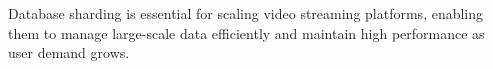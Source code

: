 Database sharding is essential for scaling video streaming platforms, enabling them to manage large-scale data efficiently and maintain high performance as user demand grows.

